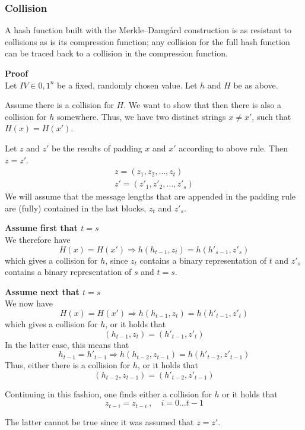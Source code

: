\subsubsection*{Collision}
A hash function built with the Merkle–Damgård construction is as
resistant to collisions as is its compression function; any collision
for the full hash function can be traced back to a collision in the
compression function.

\textbf{Proof}\\
Let $IV \in {0, 1}^n$ be a fixed, randomly chosen value. Let $h$ and $H$ be as above.

Assume there is a collision for $H$. We want to show that then there
is also a collision for $h$ somewhere. Thus, we have two distinct
strings $x \not= x'$, such that $H(x) = H(x')$.

Let $z$ and $z'$ be
the results of padding $x$ and $x'$ according to above rule. Then $z =
z'$.
\begin{align*}
  z = (z_1 , z_2 , \ldots , z_t) \\
  z' = (z'_1 , z'_2 , \ldots , z'_s )
\end{align*}
We will assume that the message lengths that are appended in the
padding rule are (fully) contained in the last blocks, $z_t$ and
$z'_s$.

\textbf{Assume first that $t = s$} \\
We therefore have
\[ H(x) = H(x') \Rightarrow h(h_{t-1} , z_t) = h(h'_{s-1} , z'_s) \]
which gives a collision for $h$, since $z_t$ contains a binary representation
of $t$ and $z'_s$ contains a binary representation of $s$ and $t = s$.

\textbf{Assume next that $t = s$} \\
We now have
\[ H(x) = H(x') \Rightarrow h(h_{t-1} , z_t) = h(h'_{t-1}, z'_t) \]
which gives a collision for $h$, or it holds that
\[ (h_{t-1} , z_t) = (h'_{t-1} , z'_t) \]
In the latter case, this means that
\[ h_{t-1} = h'_{t-1} \Rightarrow h(h_{t-2} , z_{t-1}) = h(h'_{t-2} , z'_{t-1}) \]
Thus, either there is a collision for $h$, or it holds that
\[ (h_{t-2} , z_{t-1}) = (h'_{t-2} , z'_{t-1}) \]

Continuing in this fashion, one finds either a collision for $h$ or it
holds that
\[ z_{t-i} = z_{t-i}\ , \quad  i = 0 \ldots t-1 \]

The latter cannot be true since it was assumed that $z = z'$.
